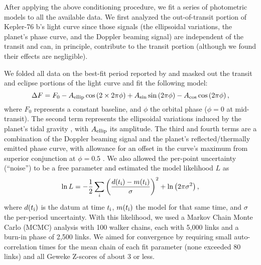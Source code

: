 \documentclass[manuscript]{aastex62}
\begin{document}
After applying the above conditioning procedure, we fit a series of photometric models to all the available data. We first analyzed the out-of-transit portion of Kepler-76 b's light curve since those signals (the ellipsoidal variations, the planet's phase curve, and the Doppler beaming signal) are independent of the transit and can, in principle, contribute to the transit portion (although we found their effects are negligible). 

We folded all data on the best-fit period reported by \citet{2013ApJ...771...26F} and masked out the transit and eclipse portions of the light curve and fit the following model:
\begin{equation}
    \Delta F = F_0 - A_{\rm ellip} \cos \left(2\times2\pi\phi \right) + A_{\rm sin} \sin \left(2 \pi\phi \right) - A_{\rm cos} \cos \left(2\pi \phi \right),
\label{eqn:BEER_curve}
\end{equation}
where $F_0$ represents a constant baseline, and $\phi$ the orbital phase ($\phi = 0$ at mid-transit). The second term represents the ellipsoidal variations induced by the planet's tidal gravity \citep{2010ApJ...713L.145W}, with $A_{\rm ellip}$ its amplitude. The third and fourth terms are a combination of the Doppler beaming signal \citep{2003ApJ...588L.117L} and the planet's reflected/thermally emitted phase curve, with allowance for an offset in the curve's maximum from superior conjunction at $\phi = 0.5$ \citep{2013ApJ...771...26F}. We also allowed the per-point uncertainty (``noise'') to be a free parameter and estimated the model likelihood $L$ as
\begin{equation}
    \ln L = -\frac{1}{2} \sum_i \bigg( \frac{ d(t_{\rm i}) - m(t_{\rm i}) }{\sigma} \bigg)^2 + \ln \left( 2 \pi \sigma^2 \right),
    \label{eqn:likelihood}
\end{equation}
where $d(t_{\rm i})$ is the datum at time $t_{\rm i}$, $m(t_{\rm i})$ the model for that same time, and $\sigma$ the per-period uncertainty. With this likelihood, we used a Markov Chain Monte Carlo (MCMC) analysis \citep{2013PASP..125..306F} with 100 walker chains, each with 5,000 links and a burn-in phase of 2,500 links. We aimed for convergence by requiring small auto-correlation times \citep[e.g.,][]{geyer1992} for the mean chain of each fit parameter (none exceeded 80 links) and all Geweke Z-scores \citep{Geweke92evaluatingthe} of about 3 or less. 
\end{document}
